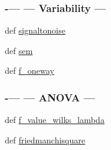 \begin{DoxyCompactItemize}
\begin{DoxyCompactList}
 \subsubsection*{-\/--- --- Variability --- }\end{DoxyCompactList}\item 
def \hyperlink{namespacescipy_1_1stats_1_1mstats__basic_a2b0521476d3e6536c790d191dbe17e24}{signaltonoise}
\item 
def \hyperlink{namespacescipy_1_1stats_1_1mstats__basic_afca0e7bcdb3cf281dda266a710b73ea2}{sem}
\item 
def \hyperlink{namespacescipy_1_1stats_1_1mstats__basic_a0dfdfdc20e1f551fd1d7f105baf12a14}{f\+\_\+oneway}
\begin{DoxyCompactList}\small\item\em 

 \subsubsection*{-\/--- --- A\+N\+O\+V\+A --- }\end{DoxyCompactList}\item 
def \hyperlink{namespacescipy_1_1stats_1_1mstats__basic_a50260ca431ef44fb6629c01ab4841d80}{f\+\_\+value\+\_\+wilks\+\_\+lambda}
\item 
def \hyperlink{namespacescipy_1_1stats_1_1mstats__basic_a7e47414e13fff14c202d4cf9476a0bcc}{friedmanchisquare}
\end{DoxyCompactItemize}

